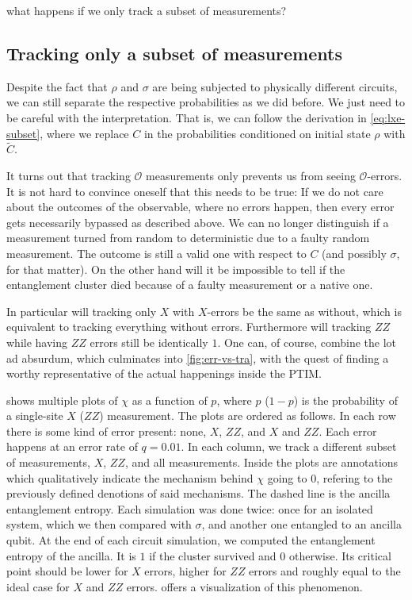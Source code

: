 what happens if we only track a subset of measurements?
\subsection{Tracking only a subset of measurements}
\label{sec:lxe-err-subset}
Despite the fact that $\rho$ and $\sigma$ are being subjected to physically
different circuits, we can still separate the respective probabilities as we
did before. We just need to be careful with the interpretation. That is, we can
follow the derivation in \cref{eq:lxe-subset}, where we replace $C$ in the
probabilities conditioned on initial state $\rho$ with $\tilde{C}$.

It turns out that tracking $\mathcal{O}$ measurements only prevents us from
seeing $\mathcal{O}$-errors. It is not hard to convince oneself that this needs to
be true: If we do not care about the outcomes of the observable, where no errors
happen, then every error gets necessarily bypassed as described above. We can
no longer distinguish if a measurement turned from random to deterministic due
to a faulty random measurement. The outcome is still a valid one with respect to
$C$ (and possibly $\sigma$, for that matter). On the other hand will it be
impossible to tell if the entanglement cluster died because of a faulty
measurement or a native one. 

In particular will tracking only $X$ with $X$-errors be the same as without, which
is equivalent to tracking everything without errors. Furthermore will tracking
$ZZ$ while having $ZZ$ errors still be identically $1$. One can, of course,
combine the lot ad absurdum, which culminates into \cref{fig:err-vs-tra}, with
the quest of finding a worthy representative of the actual happenings inside
the PTIM.

 shows multiple plots of $\chi$ as a function of
$p$, where $p$ ($1-p$) is the probability of a single-site $X$ ($ZZ$)
measurement. The plots are ordered as follows. In each row there is some kind of
error present: none, $X$, $ZZ$, and $X$ and $ZZ$. Each error happens at an
error rate of $q=0.01$. In each column, we track a different subset of
measurements, $X$, $ZZ$, and all measurements.
Inside the plots are annotations which qualitatively
indicate the mechanism behind $\chi$ going to $0$, refering to the previously
defined denotions of said mechanisms. The dashed line is the ancilla
entanglement entropy. Each simulation was done twice: once for an isolated
system, which we then compared with $\sigma$, and another one entangled to an
ancilla qubit. At the end of each circuit simulation, we computed the
entanglement entropy of the ancilla. It is $1$ if the cluster survived and $0$
otherwise. Its critical point should be lower for $X$ errors, higher for $ZZ$
errors and roughly equal to the ideal case for $X$ and $ZZ$ errors.
 offers a visualization of this phenomenon.
 

